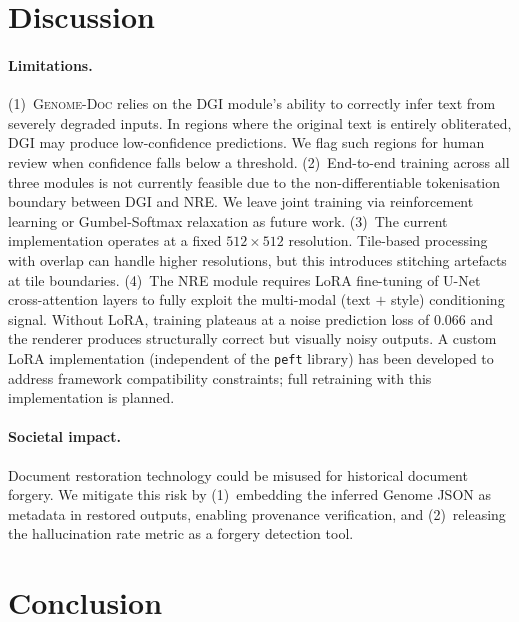 \documentclass[conference]{IEEEtran}
\newcommand{\ours}{\textsc{Genome-Doc}}
\begin{document}
\section{Discussion}
\label{sec:discussion}

\paragraph{Limitations.}
(1)~\ours{} relies on the DGI module's ability to correctly infer text from severely
degraded inputs.  In regions where the original text is entirely obliterated, DGI may
produce low-confidence predictions.  We flag such regions for human review when
confidence falls below a threshold.
(2)~End-to-end training across all three modules is not currently feasible due to the
non-differentiable tokenisation boundary between DGI and NRE.  We leave joint training
via reinforcement learning or Gumbel-Softmax relaxation as future work.
(3)~The current implementation operates at a fixed $512{\times}512$ resolution.
Tile-based processing with overlap can handle higher resolutions, but this introduces
stitching artefacts at tile boundaries.
(4)~The NRE module requires LoRA fine-tuning of U-Net cross-attention layers to
fully exploit the multi-modal (text $+$ style) conditioning signal.  Without LoRA,
training plateaus at a noise prediction loss of $0.066$ and the renderer produces
structurally correct but visually noisy outputs.  A custom LoRA implementation
(independent of the \texttt{peft} library) has been developed to address framework
compatibility constraints; full retraining with this implementation is planned.

\paragraph{Societal impact.}
Document restoration technology could be misused for historical document forgery.
We mitigate this risk by (1)~embedding the inferred Genome JSON as metadata in
restored outputs, enabling provenance verification, and (2)~releasing the
hallucination rate metric as a forgery detection tool.

\section{Conclusion}
\label{sec:conclusion}
\end{document}
